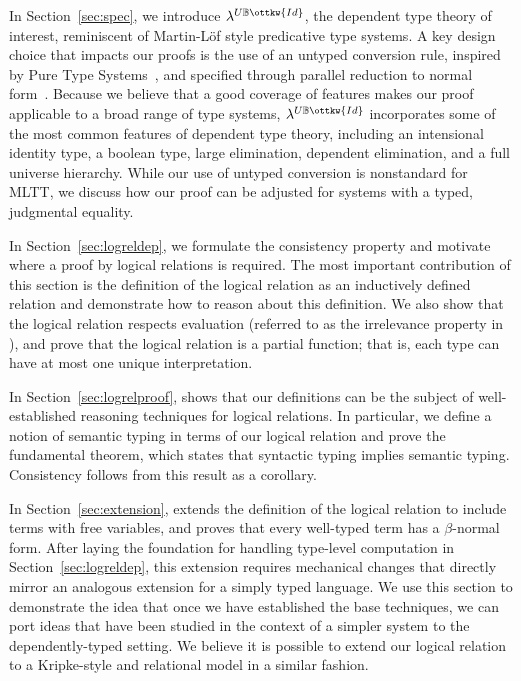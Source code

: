 \documentclass[acmsmall,screen=true,
\ifpublic review=false\else,review=true\fi
  ,anonymous=\ifanonymous true\else false\fi]{acmart}
\newcommand{\lang}{$\lambda^{U\mathbb{B}\ottkw{Id}}$\xspace}
\begin{document}
In Section~\ref{sec:spec}, we introduce \lang{}, the dependent type theory of
interest, reminiscent of Martin-Löf style predicative type systems. A key
design choice that impacts our proofs is the use of an untyped conversion
rule, inspired by Pure Type Systems~\citet{barendregt1991introduction}, and
specified through parallel reduction to normal form~\citet{barendregt}.
Because we believe that a good coverage of features makes our proof applicable
to a broad range of type systems, \lang{} incorporates some of the most common
features of dependent type theory, including an intensional identity type, a
boolean type, large elimination, dependent elimination, and a full universe
hierarchy. While our use of untyped conversion is nonstandard for MLTT, we
discuss how our proof can be adjusted for systems with a typed, judgmental
equality.

In Section~\ref{sec:logreldep}, we formulate the consistency property and
motivate where a proof by logical relations is required. The most important
contribution of this section is the definition of the logical relation as an
inductively defined relation and demonstrate how to reason about this
definition. We also show that the logical relation respects evaluation
(referred to as the irrelevance property in \citet{martin-lof-a-la-coq}), and
prove that the logical relation is a partial function; that is, each type can
have at most one unique interpretation.

In Section~\ref{sec:logrelproof}, shows that our definitions can be the
subject of well-established reasoning techniques for logical relations. In
particular, we define a notion of semantic typing in terms of our logical
relation and prove the fundamental theorem, which states that syntactic typing
implies semantic typing. Consistency follows from this result as a corollary.

In Section~\ref{sec:extension}, extends the definition of the logical relation
to include terms with free variables, and proves that every well-typed term
has a $\beta$-normal form. After laying the foundation for handling type-level
computation in Section~\ref{sec:logreldep}, this extension requires mechanical
changes that directly mirror an analogous extension for a simply typed
language. We use this section to demonstrate the idea that once we have
established the base techniques, we can port ideas that have been studied in
the context of a simpler system to the dependently-typed setting.  We believe
it is possible to extend our logical relation to a Kripke-style and relational
model in a similar fashion.
\end{document}

